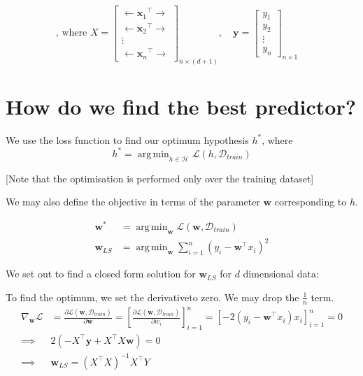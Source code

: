 \documentclass{report}
\newcommand{\tr}[1]{{{#1}^\top}} %
\newcommand{\w}{\mathbf{w}} %
\newcommand{\x}{\mathbf{x}}
\newcommand{\y}{\mathbf{y}}
\newcommand{\D}{\mathcal{D}}
\DeclareMathOperator*{\argmin}{arg\,min}
\newcommand{\loss}{\mathcal{L}}
\begin{document}
$$
  \text{, where } X =
  \begin{bmatrix}
    \longleftarrow{\tr{\x_1}} \longrightarrow \\
    \longleftarrow \tr{\x_2} \longrightarrow  \\
    \vdots                                    \\
    \longleftarrow \tr{\x_n} \longrightarrow
  \end{bmatrix}_{n\times (d+1)}, \quad
  \y =
  \begin{bmatrix}
    y_1    \\
    y_2    \\
    \vdots \\
    y_n
  \end{bmatrix}_{n\times 1}\quad
$$

\section{How do we find the best predictor?}

We use the loss function to find our optimum hypothesis $h^*$, where
$$
  h^* = \argmin_{h \in \mathcal{H}} \loss(h,\D_{train})
$$

[Note that the optimisation is performed only over the training dataset]

We may also define the objective in terms of the parameter $\w$ corresponding to $h$.

\begin{align*}
  \w^*    & = \argmin_{\w} \loss(\w,\D_{train})            \\
  \w_{LS} & = \argmin_{\w} \sum_{i=1}^n(y_i-\tr{\w} x_i)^2
\end{align*}

We set out to find a closed form solution for \(\w_{LS}\) for $d$ dimensional data:

To find the optimum, we set the derivative\footnotemark[1] to zero. We may drop the \(\frac{1}{n}\) term.
\begin{align*}
  \nabla_\w\loss & = \frac{\partial{\loss(\w,\D_{train})}}{\partial{\w}} = \left[\frac{\partial{\loss(\w,\D_{train})}}{\partial{w_i}}\right]_{i=1}^n = \left[-2(y_i-\tr{\w} x_i)x_i\right]_{i=1}^n = 0 \\
  \implies       & 2(-\tr{X} \y + \tr{X} X\w) =0                                                                                                                                                       \\
  \implies       & \w_{LS} = (\tr{X} X)^{-1}\tr{X} Y
\end{align*}
\end{document}
